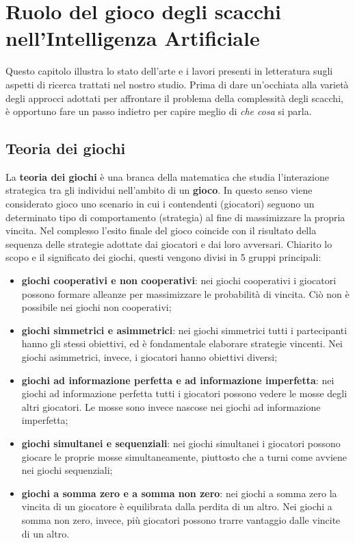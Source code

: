 \chapter{Ruolo del gioco degli scacchi nell'Intelligenza Artificiale} %
%
\begin{citazione}
    Questo capitolo illustra lo stato dell'arte e i lavori presenti in letteratura sugli aspetti di ricerca trattati nel nostro studio. 
    Prima di dare un'occhiata alla varietà degli approcci adottati per affrontare il problema della complessità degli scacchi, è opportuno fare un passo indietro per capire meglio di \textit{che cosa} si parla.
\end{citazione}
\section{Teoria dei giochi}
La \textbf{teoria dei giochi}\cite{colombo2003introduzione} è una branca della matematica che studia l'interazione strategica tra gli individui nell'ambito di un \textbf{gioco}. In questo senso viene considerato gioco uno scenario in cui i contendenti (giocatori) seguono un determinato tipo di comportamento (strategia) al fine di massimizzare la propria vincita. Nel complesso l'esito finale del gioco coincide con il risultato della sequenza delle strategie adottate dai giocatori e dai loro avversari. Chiarito lo scopo e il significato dei giochi, questi vengono divisi in 5 gruppi principali:
\begin{itemize}
    \item \textbf{giochi cooperativi e non cooperativi}: nei giochi cooperativi i giocatori possono formare alleanze per massimizzare le probabilità di vincita. Ciò non è possibile nei giochi non cooperativi;
    \item \textbf{giochi simmetrici e asimmetrici}: nei giochi simmetrici tutti i partecipanti hanno gli stessi obiettivi, ed è fondamentale elaborare strategie vincenti. Nei giochi asimmetrici, invece, i giocatori hanno obiettivi diversi;
    \item \textbf{giochi ad informazione perfetta e ad informazione imperfetta}: nei giochi ad informazione perfetta tutti i giocatori possono vedere le mosse degli altri giocatori. Le mosse sono invece nascose nei giochi ad informazione imperfetta;
    \item \textbf{giochi simultanei e sequenziali}: nei giochi simultanei i giocatori possono giocare le proprie mosse simultaneamente, piuttosto che a turni come avviene nei giochi sequenziali;
    \item \textbf{giochi a somma zero e a somma non zero}: nei giochi a somma zero la vincita di un giocatore è equilibrata dalla perdita di un altro. Nei giochi a somma non zero, invece, più giocatori possono trarre vantaggio dalle vincite di un altro.
\end{itemize}
